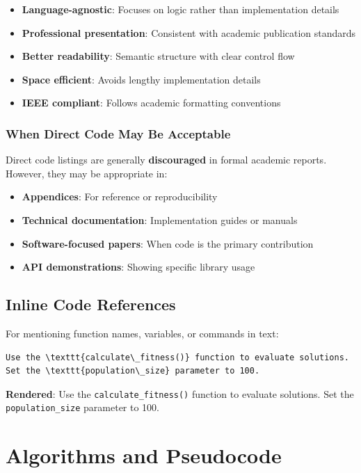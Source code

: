 \begin{itemize}
    \item \textbf{Language-agnostic}: Focuses on logic rather than implementation details
    \item \textbf{Professional presentation}: Consistent with academic publication standards
    \item \textbf{Better readability}: Semantic structure with clear control flow
    \item \textbf{Space efficient}: Avoids lengthy implementation details
    \item \textbf{IEEE compliant}: Follows academic formatting conventions
\end{itemize}

\subsubsection*{When Direct Code May Be Acceptable}

Direct code listings are generally \textbf{discouraged} in formal academic reports. However, they may be appropriate in:

\begin{itemize}
    \item \textbf{Appendices}: For reference or reproducibility
    \item \textbf{Technical documentation}: Implementation guides or manuals
    \item \textbf{Software-focused papers}: When code is the primary contribution
    \item \textbf{API demonstrations}: Showing specific library usage
\end{itemize}

\subsection*{Inline Code References}

For mentioning function names, variables, or commands in text:

\begin{verbatim}
Use the \texttt{calculate\_fitness()} function to evaluate solutions.
Set the \texttt{population\_size} parameter to 100.
\end{verbatim}

\textbf{Rendered}: Use the \texttt{calculate\_fitness()} function to evaluate solutions. Set the \texttt{population\_size} parameter to 100.

\section*{Algorithms and Pseudocode}

